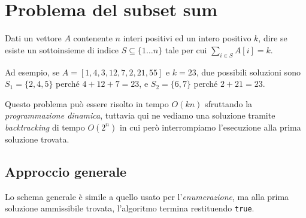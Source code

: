 \section{Problema del subset sum}
\begin{problem}
    Dati un vettore $A$ contenente $n$ interi positivi ed un intero positivo
    $k$, dire se esiste un sottoinsieme di indice $S\subseteq\{1\dots n\}$ tale
    per cui $\sum_{i\in S}A[i]=k$.
\end{problem}

\noindent
Ad esempio, se $A=[1,4,3,12,7,2,21,55]$ e $k=23$, due possibili soluzioni sono
$S_1=\{2,4,5\}$ perché $4+12+7=23$, e $S_2=\{6,7\}$ perché $2+21=23$.

\begin{note}
    Questo problema può essere risolto in tempo $O(kn)$ sfruttando la
    \emph{programmazione dinamica}, tuttavia qui ne vediamo una soluzione
    tramite \emph{backtracking} di tempo $O(2^n)$ in cui però interrompiamo
    l'esecuzione alla prima soluzione trovata.
\end{note}

\subsection{Approccio generale}
Lo schema generale è simile a quello usato per l'\emph{enumerazione}, ma alla
prima soluzione ammissibile trovata, l'algoritmo termina restituendo
\texttt{true}.

